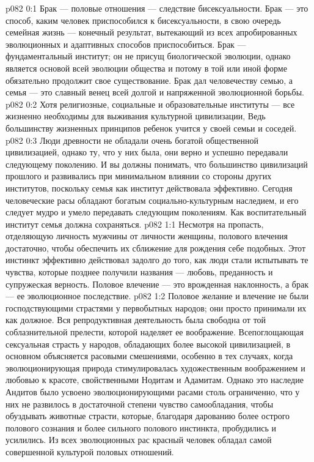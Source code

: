 \author{Глава Серафимов}
\vs p082 0:1 Брак --- половые отношения --- следствие бисексуальности. Брак --- это способ, каким человек приспособился к бисексуальности, в свою очередь семейная жизнь --- конечный результат, вытекающий из всех апробированных эволюционных и адаптивных способов приспособиться. Брак --- фундаментальный институт; он не присущ биологической эволюции, однако является основой всей эволюции общества и потому в той или иной форме обязательно продолжит свое существование. Брак дал человечеству семью, а семья --- это славный венец всей долгой и напряженной эволюционной борьбы.
\vs p082 0:2 Хотя религиозные, социальные и образовательные институты --- все жизненно необходимы для выживания культурной цивилизации,  Ведь большинству жизненных принципов ребенок учится у своей семьи и соседей.
\vs p082 0:3 Люди древности не обладали очень богатой общественной цивилизацией, однако ту, что у них была, они верно и успешно передавали следующему поколению. И вы должны понимать, что большинство цивилизаций прошлого и развивались при минимальном влиянии со стороны других институтов, поскольку семья как институт действовала эффективно. Сегодня человеческие расы обладают богатым социально\hyp{}культурным наследием, и его следует мудро и умело передавать следующим поколениям. Как воспитательный институт семья должна сохраняться.
\vs p082 1:1 Несмотря на пропасть, отделяющую личность мужчины от личности женщины, полового влечения достаточно, чтобы обеспечить их сближение для рождения себе подобных. Этот инстинкт эффективно действовал задолго до того, как люди стали испытывать те чувства, которые позднее получили названия --- любовь, преданность и супружеская верность. Половое влечение --- это врожденная наклонность, а брак --- ее эволюционное последствие.
\vs p082 1:2 Половое желание и влечение не были господствующими страстями у первобытных народов; они просто принимали их как должное. Вся репродуктивная деятельность была свободна от той соблазнительной прелести, которой наделяет ее воображение. Всепоглощающая сексуальная страсть у народов, обладающих более высокой цивилизацией, в основном объясняется расовыми смешениями, особенно в тех случаях, когда эволюционирующая природа стимулировалась художественным воображением и любовью к красоте, свойственными Нодитам и Адамитам. Однако это наследие Андитов было усвоено эволюционирующими расами столь ограниченно, что у них не развилось в достаточной степени чувство самообладания, чтобы обуздывать животные страсти, которые, благодаря дарованию более острого полового сознания и более сильного полового инстинкта, пробудились и усилились. Из всех эволюционных рас красный человек обладал самой совершенной культурой половых отношений.
